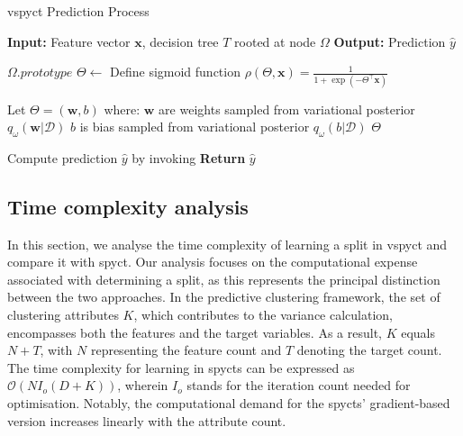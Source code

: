 \documentclass[3p,review,authoryear]{elsarticle}
\begin{document}
\begin{algorithm}
\caption{\gls{vspyct} Prediction Process}
\label{alg:make_pred}
\begin{algorithmic}[1]

\State \textbf{Input:} Feature vector $\mathbf{x}$, decision tree $T$ rooted at node $\Omega$
\State \textbf{Output:} Prediction $\hat{y}$

        \State \Return $\Omega.prototype$
    \Else
        \State $\Theta \gets$ 
        \State Define sigmoid function $\rho(\Theta, \mathbf{x}) = \frac{1}{1 + \exp(-\Theta^\top \mathbf{x})}$
            \State \Return {}
        \Else
            \State \Return {}
        \EndIf
    \EndIf
\EndFunction

    \State Let $\Theta = (\mathbf{w}, b)$ where:
    \State $\mathbf{w}$ are weights sampled from variational posterior $q_{\omega}(\mathbf{w}|\mathcal{D})$
    \State $b$ is bias sampled from variational posterior $q_{\omega}(b|\mathcal{D})$
    \State \Return $\Theta$
\EndFunction

\State Compute prediction $\hat{y}$ by invoking 
\State \textbf{Return} $\hat{y}$

\end{algorithmic}
\end{algorithm}


\subsection{Time complexity analysis}

In this section, we analyse the time complexity of learning a split in \gls{vspyct} and compare it with \gls{spyct}.
Our analysis focuses on the computational expense associated with determining a split, as this represents the principal distinction between the two approaches.
In the predictive clustering framework, the set of clustering attributes $K$, which contributes to the variance calculation, encompasses both the features and the target variables.
As a result, $K$ equals $N + T$, with $N$ representing the feature count and $T$ denoting the target count.
The time complexity for learning in \glspl{spyct} can be expressed as $\mathcal{O}(NI_o(D+K))$, wherein $I_o$ stands for the iteration count needed for optimisation.
Notably, the computational demand for the \glspl{spyct}' gradient-based version increases linearly with the attribute count.
\end{document}
